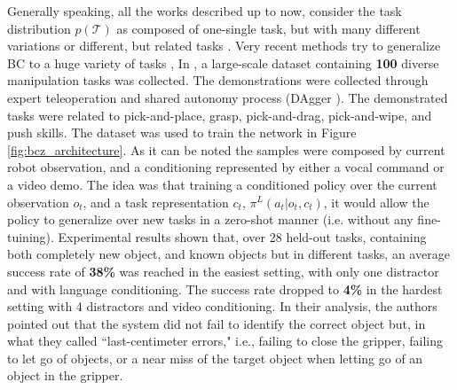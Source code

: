 Generally speaking, all the works described up to now, consider the task distribution $p(\mathcal{T})$ as composed of one-single task, but with many different variations \cite{finn2017one_shot_visual_il} or different, but related tasks \cite{yu2018daml}. Very recent methods try to generalize BC to a huge variety of tasks \cite{jang2022bc_z,mandi2022towards_more_generalizable_one_shot}, 
In \cite{jang2022bc_z}, a large-scale dataset containing \textbf{100} diverse manipulation tasks was collected. The demonstrations were collected through expert teleoperation and shared autonomy process (DAgger \cite{ross2011dagger}). The demonstrated tasks were related to pick-and-place, grasp, pick-and-drag, pick-and-wipe, and push skills. The dataset was used to train the network in Figure \ref{fig:bcz_architecture}. As it can be noted the samples were composed by current robot observation, and a conditioning represented by either a vocal command or a video demo. The idea was that training a conditioned policy over the current observation $o_{t}$, and a task representation $c_{t}$, $\pi^{L}(a_{t}|o_{t}, c_{t})$, it would allow the policy to generalize over new tasks in a zero-shot manner (i.e. without any fine-tuining). Experimental results shown that, over 28 held-out tasks, containing both completely new object, and known objects but in different tasks, an average success rate of \textbf{38\%} was reached in the easiest setting, with only one distractor and with language conditioning. The success rate dropped to \textbf{4\%} in the hardest setting with 4 distractors and video conditioning. %
In their analysis, the authors pointed out that the system did not fail to identify the correct object but, in what they called ``last-centimeter errors," i.e., failing to close the gripper, failing to let go of objects, or a near miss of the target object when letting go of an object in the gripper. 
